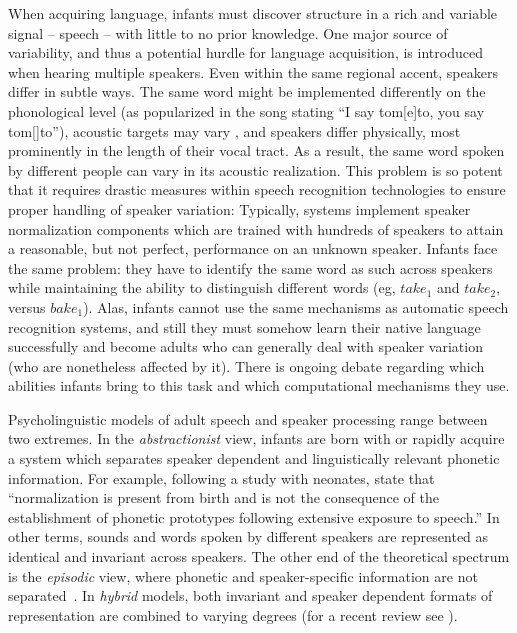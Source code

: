 \documentclass[10pt,letterpaper]{article}
\begin{document}
When acquiring language, infants must discover structure in a rich and variable signal -- speech -- with little to no prior knowledge. One major source of variability, and thus a potential hurdle for language acquisition, is introduced when hearing multiple speakers. Even within the same regional accent, speakers differ in subtle ways. The same word might be implemented differently on the phonological level (as popularized in the song stating ``I say tom[e]to, you say tom[]to''), acoustic targets may vary \cite{Cristia-s-sh}, and speakers differ physically, most prominently in the length of their vocal tract. As a result, the same word spoken by different people can vary in its acoustic realization. This problem is so potent that it requires drastic measures within speech recognition technologies to ensure proper handling of speaker variation: Typically, systems implement speaker normalization components which are trained with hundreds of speakers to attain a reasonable, but not perfect, performance on an unknown speaker. Infants face the same problem: they have to identify the same word as such across speakers while maintaining the ability to distinguish different words (eg, $take_1$ and $take_2$, versus $bake_1$). Alas, infants cannot use the same mechanisms as automatic speech recognition systems, and still they must somehow learn their native language successfully and become adults who can generally deal with speaker variation (who are nonetheless affected by it). There is ongoing debate regarding which abilities infants bring to this task and which computational mechanisms they use.  

Psycholinguistic models of adult speech and speaker processing range between two extremes. In the \textit{abstractionist} view, infants are born with or rapidly acquire a system which separates speaker dependent and linguistically relevant phonetic information. For example, following a study with neonates,  state that ``normalization is present from birth and is not the consequence of the establishment of phonetic prototypes following extensive exposure to speech.'' In other terms, sounds and words spoken by different speakers are represented as identical and invariant across speakers. The other end of the theoretical spectrum is the \textit{episodic} view, where phonetic and speaker-specific information are not separated~\cite{Goldinger}. 
In \textit{hybrid} models, both invariant and speaker dependent formats of representation are combined to varying degrees (for a recent review see ).
\end{document}
